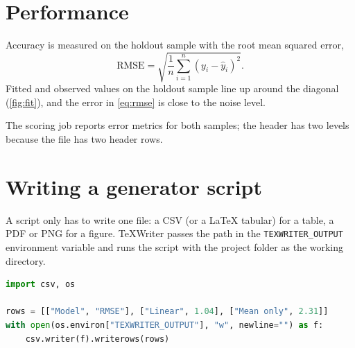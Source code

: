 \documentclass[11pt,oneside,letterpaper]{article}
\begin{document}
\section{Performance}\label{sec:performance}
Accuracy is measured on the holdout sample with the root mean squared error,
\begin{equation}\label{eq:rmse}
  \mathrm{RMSE} = \sqrt{\frac{1}{n}\sum_{i=1}^{n} \left(y_i - \hat{y}_i\right)^2} .
\end{equation}
Fitted and observed values on the holdout sample line up around the diagonal
(\autoref{fig:fit}), and the error in \eqref{eq:rmse} is close to the noise level.



The scoring job reports error metrics for both samples; the header has two levels because
the file has two header rows.



\appendix

\section{Writing a generator script}\label{app:script}
A script only has to write one file: a CSV (or a LaTeX tabular) for a table, a PDF or PNG for
a figure. TeXWriter passes the path in the \texttt{TEXWRITER\_OUTPUT} environment variable
and runs the script with the project folder as the working directory.

\begin{lstlisting}[language=Python]
import csv, os

rows = [["Model", "RMSE"], ["Linear", 1.04], ["Mean only", 2.31]]
with open(os.environ["TEXWRITER_OUTPUT"], "w", newline="") as f:
    csv.writer(f).writerows(rows)
\end{lstlisting}



\end{document}
